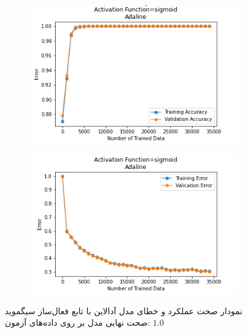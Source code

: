 \documentclass[12pt, a4paper]{article}
\begin{document}
\begin{figure}[h]
    \begin{subfigure}{0.45\linewidth}
        \centering
        \includegraphics[width=\linewidth]{images/3/adaline/activation_func/sigmoid_acc.png}
    \end{subfigure}
    \hfil
    \begin{subfigure}{0.45\linewidth}
        \centering
        \includegraphics[width=\linewidth]{images/3/adaline/activation_func/sigmoid_error.png}
    \end{subfigure}
    \caption{نمودار صحت عملکرد‌ و خطای مدل آدالاین با تابع فعال‌ساز سیگموید
    \newline
    صحت نهایی مدل بر روی داده‌های آزمون: $1.0$}
\end{figure}
\end{document}
